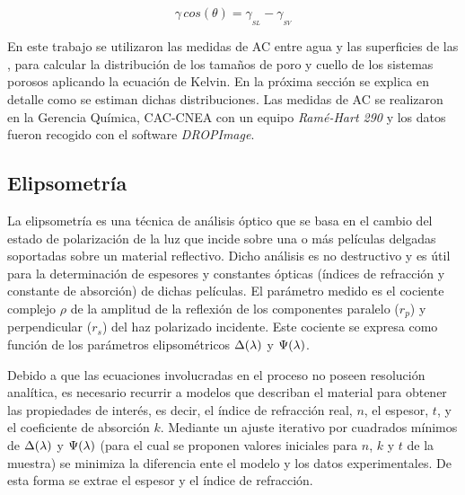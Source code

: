 			\begin{equation}
				\gamma\, cos(\theta) = \gamma_{_{SL}} - \gamma_{_{SV}}
				\label{eq:young} 
				\end{equation}

		En este trabajo se utilizaron las medidas de AC entre agua y las superficies de las \pdm, para calcular la distribución de los tamaños de poro y cuello de los sistemas porosos aplicando la ecuación de Kelvin.\cite{Boissiere2005} En la próxima sección se explica en detalle como se estiman dichas distribuciones.
		Las medidas de AC se realizaron en la Gerencia Química, CAC-CNEA con un equipo \textit{Ramé-Hart 290} y los datos fueron recogido con el software \textit{DROPImage}.

	\subsection{Elipsometría}\label{sec:elipso}

		La elipsometría es una técnica de análisis óptico que se basa en el cambio del estado de polarización de la luz que incide sobre una o más películas delgadas soportadas sobre un material reflectivo. Dicho análisis es no destructivo y es útil para la determinación de espesores y constantes ópticas (índices de refracción y constante de absorción) de dichas películas.\cite{TompkinsHarlandG.1999,Rothen1945} El parámetro medido es el cociente complejo $\rho$ de la amplitud de la reflexión de los componentes paralelo ($r_p$) y perpendicular ($r_s$) del haz polarizado incidente. Este cociente se expresa como función de los parámetros elipsométricos $\Delta(\lambda\index{longitud de onda})$ y $\Psi(\lambda\index{longitud de onda})$. 

		Debido a que las ecuaciones involucradas en el proceso no poseen resolución analítica, es necesario recurrir a modelos que describan el material para obtener las propiedades de interés, es decir, el índice de refracción real, $n$, el espesor, $t$, y el coeficiente de absorción $k$. Mediante un ajuste iterativo por cuadrados mínimos de $\Delta(\lambda\index{longitud de onda})$ y $\Psi(\lambda\index{longitud de onda})$ (para el cual se proponen valores iniciales para $n$, $k$ y $t$ de la muestra) se minimiza la diferencia ente el modelo y los datos experimentales. De esta forma se extrae el espesor y el índice de refracción. \cite{TompkinsHarlandG.1999}

